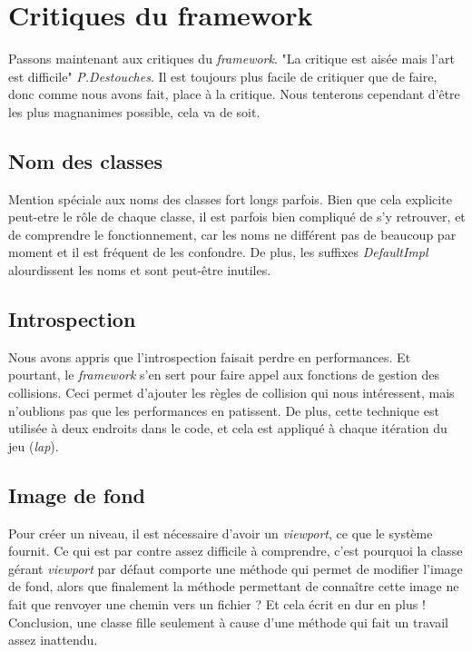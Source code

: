 \documentclass[a4paper,10pt]{article}
\begin{document}
\section{Critiques du framework }
    Passons maintenant aux critiques du \textit{framework}. "La critique est aisée mais l'art est difficile" \textit{P.Destouches}.
    Il est toujours plus facile de critiquer que de faire, donc comme nous avons fait, place à la critique. Nous tenterons
    cependant d'être les plus magnanimes possible, cela va de soit.

    \subsection{Nom des classes}
        Mention spéciale aux noms des classes fort longs parfois. Bien que cela explicite peut-etre le rôle
        de chaque classe, il est parfois bien compliqué de s'y retrouver, et de comprendre le fonctionnement,
        car les noms ne différent pas de beaucoup par moment et il est fréquent de les confondre.
        De plus, les suffixes \textit{DefaultImpl} alourdissent les noms et sont peut-être inutiles.

    \subsection{Introspection}
       	 Nous avons appris que l'introspection faisait perdre en performances. Et pourtant, le \textit{framework} s'en sert
        pour faire appel aux fonctions de gestion des collisions. Ceci permet d'ajouter les règles de collision
        qui nous intéressent, mais n'oublions pas que les performances en patissent. De plus, cette technique est
        utilisée à deux endroits dans le code, et cela est appliqué à chaque itération du jeu (\textit{lap}).

    \subsection{Image de fond}
        Pour créer un niveau, il est nécessaire d'avoir un \textit{viewport}, ce que le système fournit. Ce qui est
        par contre assez difficile à comprendre, c'est pourquoi la classe gérant \textit{viewport} par défaut
        comporte une méthode qui permet de modifier l'image de fond, alors que finalement la méthode permettant de connaître
        cette image ne fait que renvoyer une chemin vers un fichier ? Et cela écrit en dur en plus ! Conclusion, une classe
        fille seulement à cause d'une méthode qui fait un travail assez inattendu.
\end{document}
